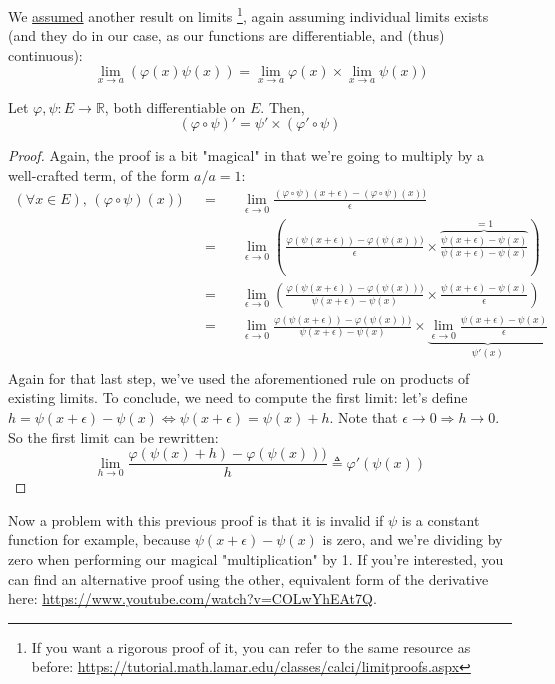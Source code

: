 \documentclass[solutions.tex]{subfiles}
\begin{document}
\begin{remark} We \underline{assumed} another result on limits
\footnote{If you want a rigorous proof of it, you can refer to the
same resource as before:
\url{https://tutorial.math.lamar.edu/classes/calci/limitproofs.aspx}},
again assuming individual limits exists (and they do in our case, as
our functions are differentiable, and (thus) continuous):
\[
	\lim_{x \rightarrow a}\left(\varphi(x)\psi(x)\right) =
		\lim_{x \rightarrow a}\varphi(x)
		\times\lim_{x \rightarrow a}\psi(x))
\]

\end{remark}
\begin{theorem} Let $\varphi, \psi : E \rightarrow \mathbb{R}$,
both differentiable on $E$. Then,
\[
	\boxed{(\varphi\circ\psi)' = \psi'\times(\varphi'\circ\psi)}
\]
\end{theorem}
\begin{proof} Again, the proof is a bit "magical" in that we're going
to multiply by a well-crafted term, of the form $a/a=1$:
\begin{equation*} \begin{aligned}
	(\forall x \in E),\, (\varphi\circ\psi)(x)) &&=\quad &
		\lim_{\epsilon \rightarrow 0}\frac{
			(\varphi\circ\psi)(x+\epsilon)-(\varphi\circ\psi)(x))
		}{\epsilon} \\
	~ &&=\quad &
		\lim_{\epsilon \rightarrow 0}\left(\frac{
			\varphi(\psi(x+\epsilon))-\varphi(\psi(x)))
		}{\epsilon}\times\overbrace{
			\frac{\psi(x+\epsilon)-\psi(x)}{\psi(x+\epsilon)-\psi(x)}
		}^{=1}\right) \\
	~ &&=\quad &
		\lim_{\epsilon \rightarrow 0}\left(\frac{
			\varphi(\psi(x+\epsilon))-\varphi(\psi(x)))
		}{\psi(x+\epsilon)-\psi(x)}\times
			\frac{\psi(x+\epsilon)-\psi(x)}{\epsilon}
		\right) \\
	~ &&=\quad &
		\lim_{\epsilon \rightarrow 0}\frac{
			\varphi(\psi(x+\epsilon))-\varphi(\psi(x)))
		}{\psi(x+\epsilon)-\psi(x)}
		\times
		\underbrace{\lim_{\epsilon \rightarrow 0}
			\frac{\psi(x+\epsilon)-\psi(x)}{\epsilon}}_{\psi'(x)}\\
\end{aligned} \end{equation*}
Again for that last step, we've used the aforementioned rule on products
of existing limits. To conclude, we need to compute the first limit: let's
define $h=\psi(x+\epsilon)-\psi(x) \Leftrightarrow \psi(x+\epsilon) = \psi(x)+h$.
Note that $\epsilon \rightarrow 0 \Rightarrow h \rightarrow 0$. So the first
limit can be rewritten:
\[
	\lim_{h \rightarrow 0}\frac{
		\varphi(\psi(x)+h)-\varphi(\psi(x)))
	}{h} \triangleq \varphi'(\psi(x))
\]
\end{proof}
Now a problem with this previous proof is that it is invalid if $\psi$ is
a constant function for example, because $\psi(x+\epsilon)-\psi(x)$ is zero,
and we're dividing by zero when performing our magical "multiplication" by 1.
If you're interested, you can find an alternative proof using the other,
equivalent form of the derivative here: \url{https://www.youtube.com/watch?v=COLwYhEAt7Q}.
\end{document}
